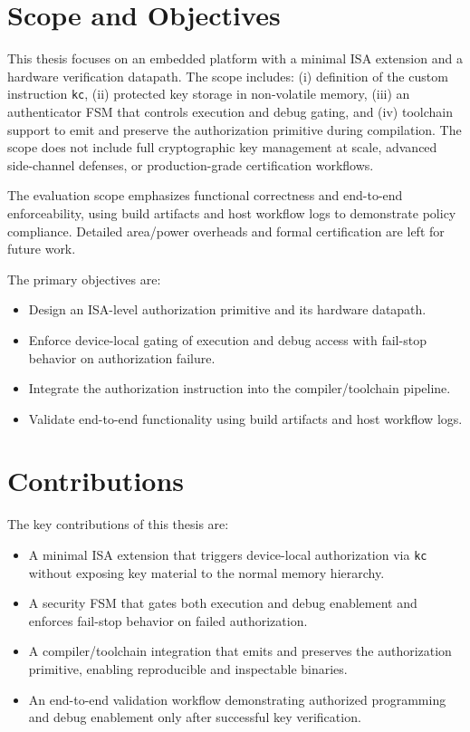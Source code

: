 \section{Scope and Objectives}
This thesis focuses on an embedded platform with a minimal ISA extension and a
hardware verification datapath. The scope includes: (i) definition of the custom
instruction \texttt{kc}, (ii) protected key storage in non-volatile memory, (iii) an
authenticator FSM that controls execution and debug gating, and (iv) toolchain support
to emit and preserve the authorization primitive during compilation. The scope does
not include full cryptographic key management at scale, advanced side-channel defenses,
or production-grade certification workflows.

The evaluation scope emphasizes functional correctness and end-to-end enforceability,
using build artifacts and host workflow logs to demonstrate policy compliance. Detailed
area/power overheads and formal certification are left for future work.

The primary objectives are:
\begin{itemize}
  \item Design an ISA-level authorization primitive and its hardware datapath.
  \item Enforce device-local gating of execution and debug access with fail-stop
        behavior on authorization failure.
  \item Integrate the authorization instruction into the compiler/toolchain pipeline.
  \item Validate end-to-end functionality using build artifacts and host workflow logs.
\end{itemize}

\section{Contributions}
The key contributions of this thesis are:
\begin{itemize}
  \item A minimal ISA extension that triggers device-local authorization via
        \texttt{kc} without exposing key material to the normal memory hierarchy.
  \item A security FSM that gates both execution and debug enablement and enforces
        fail-stop behavior on failed authorization.
  \item A compiler/toolchain integration that emits and preserves the authorization
        primitive, enabling reproducible and inspectable binaries.
  \item An end-to-end validation workflow demonstrating authorized programming and
        debug enablement only after successful key verification.
\end{itemize}

